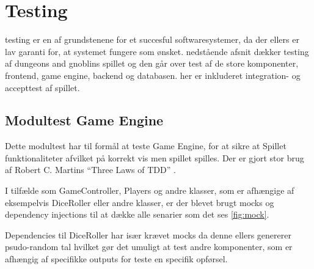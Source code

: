 \section{Testing}
testing er en af grundstenene for et succesful softwaresystemer, da der ellers 
er lav garanti for, at systemet fungere som ønsket.
nedstående afsnit dækker testing af dungeons and gnoblins spillet og den går over
test af de store komponenter, frontend, game engine, backend og databasen. her 
er inkluderet integration- og accepttest af spillet.

\subsection{Modultest Game Engine}
Dette modultest har til formål at teste Game Engine, for at sikre at Spillet
funktionaliteter afvilket på korrekt vis men spillet spilles. Der er gjort
stor brug af Robert C. Martins ``Three Laws of TDD'' \parencite[Side 122]{CleanCode}.

I tilfælde som GameController, Players og andre klasser, som er afhængige af 
eksempelvis DiceRoller eller andre klasser, er der blevet brugt mocks og
dependency injections til at dække alle senarier som det ses \autoref{fig:mock}.

Dependencies til DiceRoller har især krævet mocks da denne ellers genererer 
psudo-random tal hvilket gør det umuligt at test andre komponenter, som er 
afhængig af specifikke outputs for teste en specifik opførsel.

\newpage 

